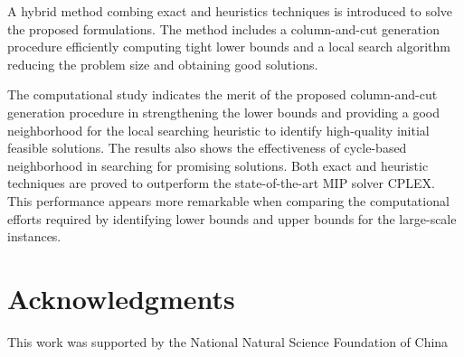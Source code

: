 \documentclass[11pt,nonblindrev,fleqn]{article}
\begin{document}
A hybrid method combing exact and heuristics techniques is introduced to solve the proposed formulations. The method includes a column-and-cut generation procedure efficiently computing tight lower bounds and a local search algorithm reducing the problem size and obtaining good solutions.

The computational study indicates the merit of the proposed column-and-cut generation procedure in strengthening the lower bounds and providing a good neighborhood for the local searching heuristic to identify high-quality initial feasible solutions. The results also shows the effectiveness of cycle-based neighborhood in searching for promising solutions. Both exact and heuristic techniques are proved to outperform the state-of-the-art MIP solver CPLEX. This performance appears more remarkable when comparing the computational efforts required by identifying lower bounds and upper bounds for the large-scale instances.
\section*{Acknowledgments}

This work was supported by the National Natural Science Foundation of China
\end{document}
